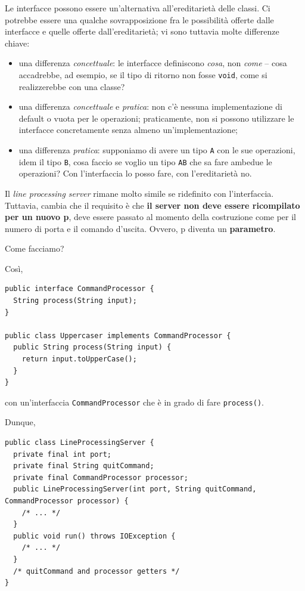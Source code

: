 \documentclass[\fontsizeclass,twocolumn]{\classname}
\theoremstyle{definition}
\theoremstyle{definition}
\begin{document}
Le interfacce possono essere un'alternativa all'ereditarietà delle classi. Ci
potrebbe essere una qualche sovrapposizione fra le possibilità offerte dalle
interfacce e quelle offerte dall'ereditarietà; vi sono tuttavia molte
differenze chiave:
\begin{itemize}
    \item una differenza \emph{concettuale}: le interfacce definiscono
        \emph{cosa}, non \emph{come} -- cosa accadrebbe, ad esempio, se il tipo
        di ritorno non fosse \texttt{void}, come si realizzerebbe con una
        classe?
    \item una differenza \emph{concettuale} e \emph{pratica}: non c'è nessuna
        implementazione di default o vuota per le operazioni; praticamente, non
        si possono utilizzare le interfacce concretamente senza almeno
        un'implementazione;
    \item una differenza \emph{pratica}: supponiamo di avere un tipo \texttt{A}
        con le sue operazioni, idem il tipo \texttt{B}, cosa faccio se voglio
        un tipo \texttt{AB} che sa fare ambedue le operazioni? Con
        l'interfaccia lo posso fare, con l'ereditarietà no.
\end{itemize}

Il \emph{line processing server} rimane molto simile se ridefinito con
l'interfaccia. Tuttavia, cambia che il requisito è che \textbf{il server non
deve essere ricompilato per un nuovo p}, deve essere passato al momento della
costruzione come per il numero di porta e il comando d'uscita. Ovvero, p
diventa un \textbf{parametro}.

Come facciamo?

Così,

\begin{lstlisting}
public interface CommandProcessor {
  String process(String input);
}

public class Uppercaser implements CommandProcessor {
  public String process(String input) {
    return input.toUpperCase();
  }
}
\end{lstlisting}

con un'interfaccia \texttt{CommandProcessor} che è in grado di fare
\texttt{process()}.

Dunque,

\begin{lstlisting}
public class LineProcessingServer {
  private final int port;
  private final String quitCommand;
  private final CommandProcessor processor;
  public LineProcessingServer(int port, String quitCommand, CommandProcessor processor) {
    /* ... */
  }
  public void run() throws IOException {
    /* ... */
  }
  /* quitCommand and processor getters */
}
\end{lstlisting}
\end{document}
